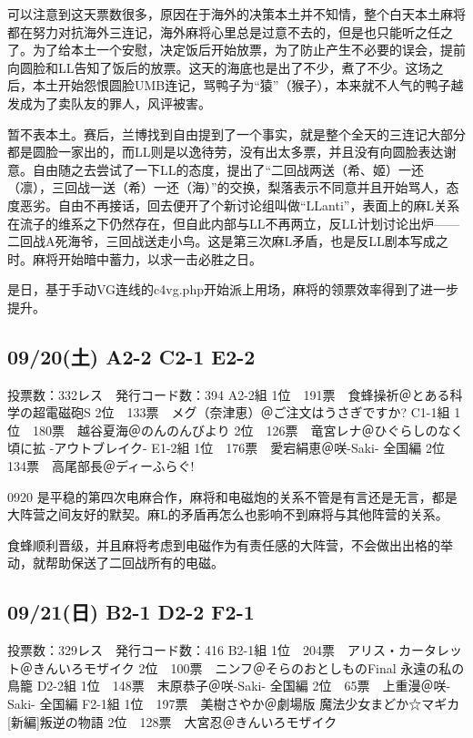 可以注意到这天票数很多，原因在于海外的决策本土并不知情，整个白天本土麻将都在努力对抗海外三连记，海外麻将心里总是过意不去的，但是也只能听之任之了。为了给本土一个安慰，决定饭后开始放票，为了防止产生不必要的误会，提前向圆脸和LL告知了饭后的放票。这天的海底也是出了不少，煮了不少。这场之后，本土开始怨恨圆脸UMB连记，骂鸭子为“猿”（猴子），本来就不人气的鸭子越发成为了卖队友的罪人，风评被害。

暂不表本土。赛后，兰博找到自由提到了一个事实，就是整个全天的三连记大部分都是圆脸一家出的，而LL则是以逸待劳，没有出太多票，并且没有向圆脸表达谢意。自由随之去尝试了一下LL的态度，提出了“二回战两送（希、姬）一还（凛），三回战一送（希）一还（海）”的交换，梨落表示不同意并且开始骂人，态度恶劣。自由不再接话，回去便开了个新讨论组叫做“LLanti”，表面上的麻L关系在流子的维系之下仍然存在，但自此内部与LL不再两立，反LL计划讨论出炉——二回战A死海爷，三回战送走小鸟。这是第三次麻L矛盾，也是反LL剧本写成之时。麻将开始暗中蓄力，以求一击必胜之日。

是日，基于手动VG连线的c4vg.php开始派上用场，麻将的领票效率得到了进一步提升。

\subsection{09/20(土) A2-2 C2-1 E2-2}

	投票数：332レス　発行コード数：394
	A2-2組
	1位　191票　食蜂操祈＠とある科学の超電磁砲S
	2位　133票　メグ（奈津恵）＠ご注文はうさぎですか?
	C1-1組
	1位　180票　越谷夏海＠のんのんびより
	2位　126票　竜宮レナ＠ひぐらしのなく頃に拡 -アウトブレイク-
	E1-2組
	1位　176票　愛宕絹恵＠咲-Saki- 全国編
	2位　134票　高尾部長＠ディーふらぐ!

0920 是平稳的第四次电麻合作，麻将和电磁炮的关系不管是有言还是无言，都是大阵营之间友好的默契。麻L的矛盾再怎么也影响不到麻将与其他阵营的关系。

食蜂顺利晋级，并且麻将考虑到电磁作为有责任感的大阵营，不会做出出格的举动，就帮助保送了二回战所有的电磁。

\subsection{09/21(日) B2-1 D2-2 F2-1}

	投票数：329レス　発行コード数：416
	B2-1組
	1位　204票　アリス・カータレット＠きんいろモザイク
	2位　100票　ニンフ＠そらのおとしものFinal 永遠の私の鳥籠
	D2-2組
	1位　148票　末原恭子＠咲-Saki- 全国編
	2位　65票　上重漫＠咲-Saki- 全国編
	F2-1組
	1位　197票　美樹さやか＠劇場版 魔法少女まどか☆マギカ[新編]叛逆の物語
	2位　128票　大宮忍＠きんいろモザイク


